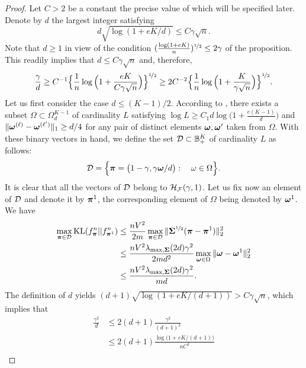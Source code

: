 \begin{proof}
	Let $C>2$ be a constant the precise value of which will be specified later.
	Denote by  $d$ the largest integer satisfying
	\begin{equation}\label{eqFvSxFv}
	d\sqrt{\log(1+eK/d)} \leq C{\gamma\sqrt{n}}.
	\end{equation}
	Note that $d\ge 1$ in view of the condition $(\frac{\log(1+eK)}{n})^{\nicefrac12}\le 2\gamma$ of the 
	proposition. This readily implies that $d\leq C\gamma\sqrt{n}$ and, therefore, 
	\begin{equation}\label{eqFvSxSx}
	\frac{\gamma}{d} 
	\ge C^{-1}\Big\{{\frac1n\log\Big(1+\frac{eK}{C\gamma\sqrt{n}}\Big)}\Big\}^{\nicefrac12}
	\ge 2C^{-2}\Big\{{\frac1n\log\Big(1+\frac{K}{\gamma\sqrt{n}}\Big)}\Big\}^{\nicefrac12}.
	\end{equation}
	Let us first consider the case $d \leq (K-1)/2$. According to , there 
	exists a subset $\Omega \subset \Omega_{d}^{K-1}$ of cardinality $L$ satisfying 
	$\log L\geq C_1d\log\big(1+\frac{e(K-1)}{d}\big)$ and $\|\boldsymbol \omega^{(\ell)}-\boldsymbol \omega^{(\ell')}\|_1\geq d/4$
	for any pair of distinct elements $\boldsymbol \omega,\boldsymbol \omega'$ taken from $\Omega$. With these 
	binary vectors in hand, we define the set $\mathcal D \subset {\mathbb B}_+^K$ of cardinality $L$ as follows:
	\begin{equation}
	\mathcal D = \Big\{\boldsymbol \pi = \big(1-\gamma,{\gamma}\boldsymbol \omega/{d}\big) : \quad\omega \in \Omega\Big\}.
	\end{equation}
	It is clear that all the vectors of $\mathcal D$ belong to $\mathcal H_\mathcal F(\gamma,1)$. 
	Let us fix now an element of $\mathcal D$ and denote it by $\boldsymbol \pi^1$, the corresponding element of
	$\Omega$ being denoted by $\boldsymbol \omega^1$. We have
	\begin{align}
	\max_{\boldsymbol \pi\in\mathcal D}{\rm KL}(f^n_{\boldsymbol \pi}||f^n_{\boldsymbol \pi^1})
	&\leq \frac{nV^2}{2m}\max_{\boldsymbol \pi\in\mathcal D} \|\boldsymbol\Sigma^{\nicefrac12}(\boldsymbol \pi-\boldsymbol \pi^{1})\|_2^2 \\
	&\leq \frac{nV^2\lambda_{\max,\boldsymbol\Sigma}(2d)\gamma^2}{2m d^2} \max_{\boldsymbol \omega\in\Omega}
	\|\boldsymbol \omega-\boldsymbol \omega^{1}\|_2^2\\
	&\leq \frac{nV^2\lambda_{\max,\boldsymbol\Sigma}(2d)\gamma^2}{m d}. \label{eqKLlowerBoundInq}
	\end{align}
	The definition of $d$ yields $(d+1)\sqrt{\log(1+eK/(d+1))}> C\gamma\sqrt{n}$, which implies that
	\begin{align}
	\frac{\gamma^2}{d}
	&\leq 2(d+1)\frac{\gamma^2}{(d+1)^2}\nonumber\\
	&\leq 2(d+1)\frac{\log\big(1+eK/(d+1)\big)}{nC^2}\nonumber\\

\end{align}
\end{proof}
